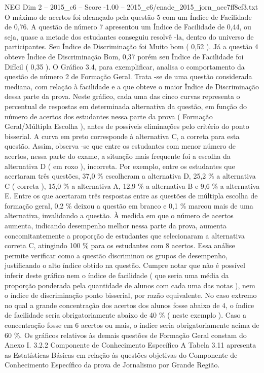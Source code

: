 \begin{textsample}{NEG Dim 2 – 2015\_c6 – Score -1.00 – 2015\_c6/enade\_2015\_jorn\_aec7ff8cf3.txt}
O máximo de acertos foi alcançado pela questão 5 com um Índice de Facilidade de 0,76.
A questão de número 7 apresentou um Índice de Facilidade de 0,44, ou seja, quase a metade dos estudantes conseguiu resolvê -la, dentro do universo de participantes.
Seu Índice de Discriminação foi Muito bom ( 0,52 ).
Já a questão 4 obteve Índice de Discriminação Bom, 0,37 porém seu Índice de Facilidade foi Difícil ( 0,35 ).
O Gráfico 3.4, para exemplificar, analisa o comportamento da questão de número 2 de Formação Geral.
Trata -se de uma questão considerada mediana, com relação à facilidade e a que obteve o maior Índice de Discriminação dessa parte da prova.
Neste gráfico, cada uma das cinco curvas representa o percentual de respostas em determinada alternativa da questão, em função do número de acertos dos estudantes nessa parte da prova ( Formação Geral/Múltipla Escolha ), antes de possíveis eliminações pelo critério do ponto bisserial.
A curva em preto corresponde à alternativa C, a correta para esta questão.
Assim, observa -se que entre os estudantes com menor número de acertos, nessa parte do exame, a situação mais frequente foi a escolha da alternativa D ( em roxo ), incorreta.
Por exemplo, entre os estudantes que acertaram três questões, 37,0 \% escolheram a alternativa D, 25,2 \% a alternativa C ( correta ), 15,0 \% a alternativa A, 12,9 \% a alternativa B e 9,6 \% a alternativa E.
Entre os que acertaram três respostas entre as questões de múltipla escolha de formação geral, 0,2 \% deixou a questão em branco e 0,1 \% marcou mais de uma alternativa, invalidando a questão.
À medida em que o número de acertos aumenta, indicando desempenho melhor nessa parte da prova, aumenta concomitantemente a proporção de estudantes que selecionaram a alternativa correta C, atingindo 100 \% para os estudantes com 8 acertos.
Essa análise permite verificar como a questão discriminou os grupos de desempenho, justificando o alto índice obtido na questão.
Cumpre notar que não é possível inferir deste gráfico nem o índice de facilidade ( que seria uma média da proporção ponderada pela quantidade de alunos com cada uma das notas ), nem o índice de discriminação ponto bisserial, por razão equivalente.
No caso extremo no qual a grande concentração dos acertos dos alunos fosse abaixo de 4, o índice de facilidade seria obrigatoriamente abaixo de 40 \% ( neste exemplo ).
Caso a concentração fosse em 6 acertos ou mais, o índice seria obrigatoriamente acima de 60 \%.
Os gráficos relativos às demais questões de Formação Geral constam do Anexo I. 3.2.2 Componente de Conhecimento Específico A Tabela 3.11 apresenta as Estatísticas Básicas em relação às questões objetivas do Componente de Conhecimento Específico da prova de Jornalismo por Grande Região.

\end{textsample}
